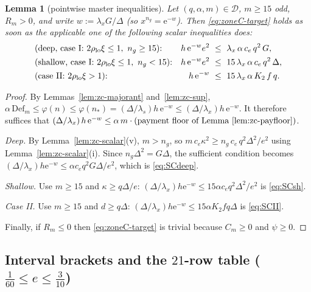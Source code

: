 \documentclass[11pt]{article}
\newtheorem{lemma}[theorem]{Lemma}
\theoremstyle{remark}
\theoremstyle{plain}
\theoremstyle{plain}
\newcommand{\eu}{\mathrm{e}}
\newcommand{\D}{\mathcal D}
\begin{document}
\begin{lemma}[pointwise master inequalities]\label{lem:zc-master}
Let $(q,\alpha,m)\in\D$, $m\ge15$ odd, $R_m>0$, and write $w:=\lambda_xG/\Delta$
(so $x^{n_g}=\eu^{-w}$).  Then \eqref{eq:zoneC-target} holds as soon as the
applicable one of the following scalar inequalities does:
\begin{align}
 &\textup{(deep, case I: }2\rho_{\mathrm{lo}}\xi\le1,\ n_g\ge15\textup{):}
 &h\,\eu^{-w}e^2\ &\le\ \lambda_x\,\alpha\,c_e\,q^2\,G,
 \label{eq:SCdeep}\\
 &\textup{(shallow, case I: }2\rho_{\mathrm{lo}}\xi\le1,\ n_g<15\textup{):}
 &h\,\eu^{-w}e^2\ &\le\ 15\,\lambda_x\,\alpha\,c_e\,q^2\,\Delta,
 \label{eq:SCsh}\\
 &\textup{(case II: }2\rho_{\mathrm{lo}}\xi>1\textup{):}
 &h\,\eu^{-w}\ &\le\ 15\,\lambda_x\,\alpha\,K_2\,f\,q.
 \label{eq:SCII}
\end{align}
\end{lemma}

\begin{proof}
By Lemmas~\ref{lem:zc-majorant} and~\ref{lem:zc-sup},
$\alpha\,\mathrm{Def}_m\le\varphi(n)\le\varphi(n_*)
=(\Delta/\lambda_s)h\,\eu^{-w}\le(\Delta/\lambda_x)h\,\eu^{-w}$.
It therefore suffices that
$(\Delta/\lambda_x)\,h\,\eu^{-w}\le\alpha\,m\cdot(\text{payment floor of
Lemma~\ref{lem:zc-payfloor}})$.

\emph{Deep.}  By Lemma~\ref{lem:zc-scalar}(v), $m>n_g$, so
$m\,c_e\kappa^2\ge n_g\,c_e\,q^2\Delta^2/e^2$ using
Lemma~\ref{lem:zc-scalar}(i).  Since $n_g\Delta^2=G\Delta$, the sufficient
condition becomes
$(\Delta/\lambda_x)h\eu^{-w}\le\alpha c_eq^2G\Delta/e^2$, which is
\eqref{eq:SCdeep}.

\emph{Shallow.}  Use $m\ge15$ and $\kappa\ge q\Delta/e$:
$(\Delta/\lambda_x)h\eu^{-w}\le15\alpha c_eq^2\Delta^2/e^2$ is
\eqref{eq:SCsh}.

\emph{Case II.}  Use $m\ge15$ and $d\ge q\Delta$:
$(\Delta/\lambda_x)h\eu^{-w}\le15\alpha K_2fq\Delta$ is \eqref{eq:SCII}.

Finally, if $R_m\le0$ then \eqref{eq:zoneC-target} is trivial because
$C_m\ge0$ and $\psi\ge0$.
\end{proof}

\subsection{Interval brackets and the $21$-row table
($\tfrac1{60}\le e\le\tfrac3{10}$)}\label{sec:zoneC-table}
\end{document}
